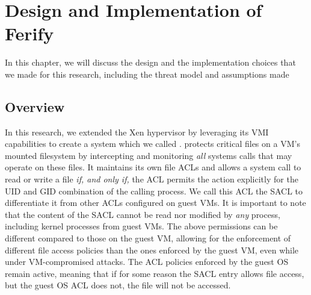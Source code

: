 {}

\chapter{Design and Implementation of Ferify}\label{ch:chapter3}

In this chapter, we will discuss the design and the implementation choices that we made for this research, including the threat model and assumptions made

\section{Overview}\label{sec:overview}

\par In this research, we extended the Xen hypervisor by leveraging its \ac{VMI} capabilities to create a system which we called .  protects critical files on a \ac{VM}'s mounted filesystem by intercepting and monitoring \emph{all} systems calls that may operate on these files. It maintains its own file \acp{ACL} and allows a system call to read or write a file \emph{if, and only if,} the \ac{ACL} permits the action explicitly for the \ac{UID} and \ac{GID} combination of the calling process. We call this \ac{ACL} the \ac{SACL} to differentiate it from other \acp{ACL} configured on guest \acp{VM}. It is important to note that the content of the \ac{SACL} cannot be read nor modified by \emph{any} process, including kernel processes from guest \acp{VM}. The above permissions can be different compared to those on the guest \ac{VM}, allowing for the enforcement of different file access policies than the ones enforced by the guest \ac{VM}, even while under \ac{VM}-compromised attacks. The \ac{ACL} policies enforced by the guest \ac{OS} remain active, meaning that if for some reason the \ac{SACL} entry allows file access, but the guest \ac{OS} \ac{ACL} does not, the file will not be accessed.

